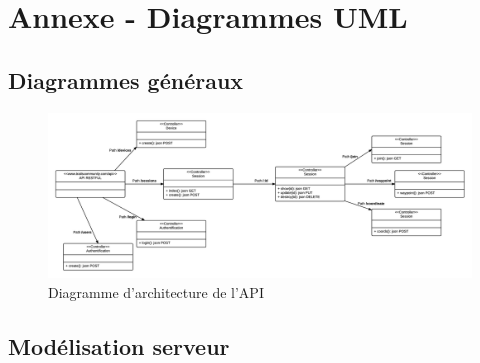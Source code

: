 \documentclass[titlepage, 12pt]{report}
\begin{document}
\part{Annexe - Diagrammes UML}

\chapter{Diagrammes généraux}

\begin{figure}[!h]
	\caption{Diagramme d'architecture de l'API}
	\label{API_architecture}
	\centering
	\includegraphics[scale=0.5]{Images/diagram/API_architecture.png}
\end{figure}

\chapter{Modélisation serveur}
\end{document}
